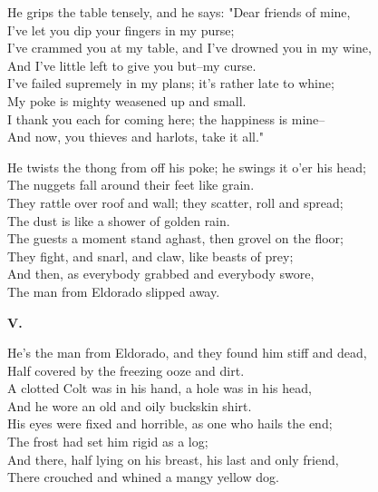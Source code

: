 \begin{poemblock}
He grips the table tensely, and he says:  "Dear friends of mine,\\
\idt I've let you dip your fingers in my purse;\\
I've crammed you at my table, and I've drowned you in my wine,\\
\idt And I've little left to give you but--my curse.\\
I've failed supremely in my plans; it's rather late to whine;\\
\idt My poke is mighty weasened up and small.\\
I thank you each for coming here; the happiness is mine--\\
\idt And now, you thieves and harlots, take it all."

He twists the thong from off his poke; he swings it o'er his head;\\
\idt The nuggets fall around their feet like grain.\\
They rattle over roof and wall; they scatter, roll and spread;\\
\idt The dust is like a shower of golden rain.\\
The guests a moment stand aghast, then grovel on the floor;\\
\idt They fight, and snarl, and claw, like beasts of prey;\\
And then, as everybody grabbed and everybody swore,\\
\idt The man from Eldorado slipped away.

\textbf{V.}

He's the man from Eldorado, and they found him stiff and dead,\\
\idt Half covered by the freezing ooze and dirt.\\
A clotted Colt was in his hand, a hole was in his head,\\
\idt And he wore an old and oily buckskin shirt.\\
His eyes were fixed and horrible, as one who hails the end;\\
\idt The frost had set him rigid as a log;\\
And there, half lying on his breast, his last and only friend,\\
\idt There crouched and whined a mangy yellow dog.
\end{poemblock}

